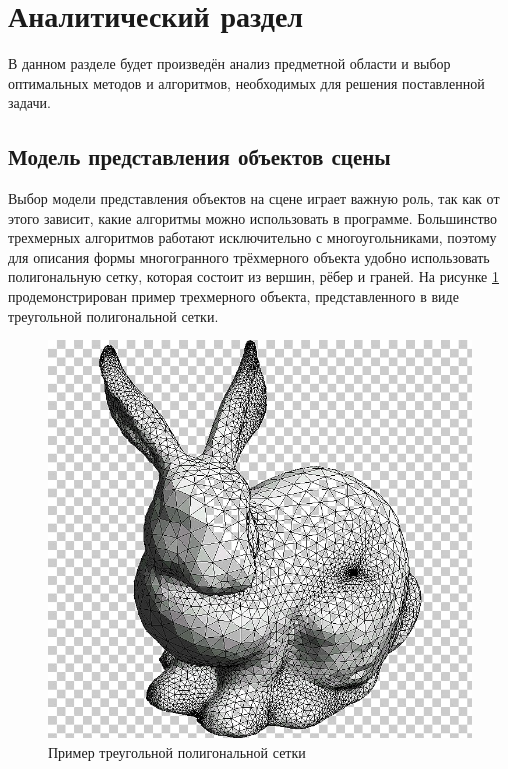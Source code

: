 \documentclass[54pt, a4paper]{article}
\begin{document}
	\newpage
	\section{Аналитический раздел}
	В данном разделе будет произведён анализ предметной области и выбор оптимальных методов и алгоритмов, необходимых для решения поставленной задачи.
	\subsection{Модель представления объектов сцены} \label{model}
	Выбор модели представления объектов на сцене играет важную роль, так как от этого зависит, какие алгоритмы можно использовать в программе. Большинство трехмерных алгоритмов работают исключительно с многоугольниками, поэтому для описания формы многогранного трёхмерного объекта удобно использовать полигональную сетку, которая состоит из вершин, рёбер и граней.
	На рисунке \ref{ris:rabbit} продемонстрирован пример трехмерного объекта, представленного в виде треугольной полигональной сетки.\\
	\begin{figure}[ht!]
		\centering
		\includegraphics[scale=0.3]{img/rabbit.jpg}
		\caption{Пример треугольной полигональной сетки}
		\label{ris:rabbit}
	\end{figure}
	
\end{document}
